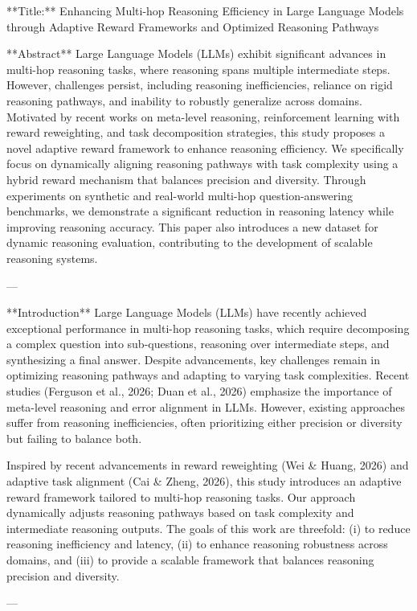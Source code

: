 **Title:** Enhancing Multi-hop Reasoning Efficiency in Large Language Models through Adaptive Reward Frameworks and Optimized Reasoning Pathways  

**Abstract**  
Large Language Models (LLMs) exhibit significant advances in multi-hop reasoning tasks, where reasoning spans multiple intermediate steps. However, challenges persist, including reasoning inefficiencies, reliance on rigid reasoning pathways, and inability to robustly generalize across domains. Motivated by recent works on meta-level reasoning, reinforcement learning with reward reweighting, and task decomposition strategies, this study proposes a novel adaptive reward framework to enhance reasoning efficiency. We specifically focus on dynamically aligning reasoning pathways with task complexity using a hybrid reward mechanism that balances precision and diversity. Through experiments on synthetic and real-world multi-hop question-answering benchmarks, we demonstrate a significant reduction in reasoning latency while improving reasoning accuracy. This paper also introduces a new dataset for dynamic reasoning evaluation, contributing to the development of scalable reasoning systems.  

---

**Introduction**  
Large Language Models (LLMs) have recently achieved exceptional performance in multi-hop reasoning tasks, which require decomposing a complex question into sub-questions, reasoning over intermediate steps, and synthesizing a final answer. Despite advancements, key challenges remain in optimizing reasoning pathways and adapting to varying task complexities. Recent studies (Ferguson et al., 2026; Duan et al., 2026) emphasize the importance of meta-level reasoning and error alignment in LLMs. However, existing approaches suffer from reasoning inefficiencies, often prioritizing either precision or diversity but failing to balance both.  

Inspired by recent advancements in reward reweighting (Wei & Huang, 2026) and adaptive task alignment (Cai & Zheng, 2026), this study introduces an adaptive reward framework tailored to multi-hop reasoning tasks. Our approach dynamically adjusts reasoning pathways based on task complexity and intermediate reasoning outputs. The goals of this work are threefold: (i) to reduce reasoning inefficiency and latency, (ii) to enhance reasoning robustness across domains, and (iii) to provide a scalable framework that balances reasoning precision and diversity.  

---

